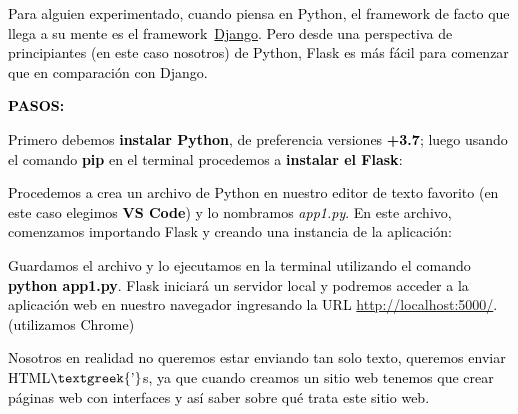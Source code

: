 \documentclass[a4paper]{article}
\newcommand\textstyleInternetlink[1]{\textcolor{blue}{#1}}
\begin{document}
{
\textcolor{black}{Para alguien experimentado, cuando piensa en Python, el framework de facto que llega a su mente es el
framework }\href{https://www.djangoproject.com/}{\textstyleInternetlink{\textcolor{black}{Django}}}\textcolor{black}{.
Pero desde una perspectiva de principiantes (en este caso nosotros) de Python, Flask es más fácil para comenzar que en
comparación con Django.}}


\bigskip

{
\textbf{\textcolor{black}{PASOS:}}}

{
\textcolor{black}{Primero debemos }\textbf{\textcolor{black}{instalar Python}}\textcolor{black}{, de preferencia
versiones }\textbf{\textcolor{black}{+3.7}}\textcolor{black}{; luego usando el comando
}\textbf{\textcolor{black}{pip}}\textcolor{black}{ en el terminal procedemos a }\textbf{\textcolor{black}{instalar el
Flask}}\textcolor{black}{:}}




{
\textcolor{black}{Procedemos a crea un archivo de Python en nuestro editor de texto favorito (en este caso elegimos
}\textbf{\textcolor{black}{VS Code}}\textcolor{black}{) y lo nombramos
}\textit{\textcolor{black}{app1.py}}\textcolor{black}{. En este archivo, comenzamos importando Flask y creando una
instancia de la aplicación:}}





\bigskip

{
\textcolor{black}{Guardamos el archivo y lo ejecutamos en la terminal utilizando el comando
}\textbf{\textcolor{black}{python app1.py}}\textcolor{black}{. Flask iniciará un servidor local y podremos acceder a la
aplicación web en nuestro navegador ingresando la URL }\url{http://localhost:5000/}\textcolor{black}{. (utilizamos
Chrome)}}





\bigskip

{
\textcolor{black}{Nosotros en realidad no queremos estar enviando tan solo texto, queremos enviar
HTML$\text{\textgreek{’}}$s, ya que cuando creamos un sitio web tenemos que crear páginas web con interfaces y así
saber sobre qué trata este sitio web.}}
\end{document}
